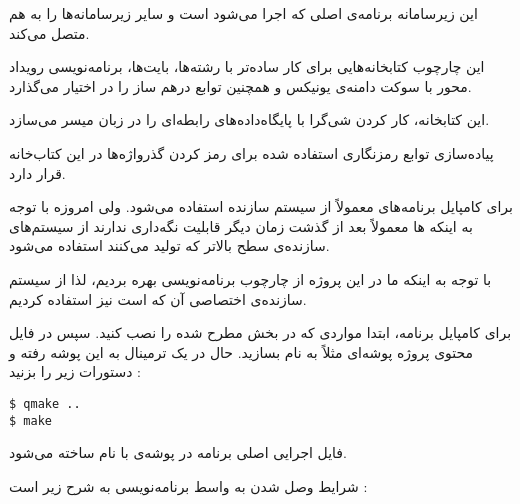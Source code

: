 این زیرسامانه برنامه‌ی اصلی که اجرا می‌شود است و سایر زیر‌سامانه‌ها را به هم متصل می‌کند.




این چارچوب کتابخانه‌هایی برای کار ساده‌تر با رشته‌ها، بایت‌ها، برنامه‌نویسی رویداد محور با سوکت دامنه‌ی یونیکس و همچنین توابع درهم ساز را در اختیار می‌گذارد. 


این کتابخانه، کار کردن شی‌گرا با پایگاه‌داده‌های رابطه‌ای را در زبان  میسر می‌سازد.


پیاده‌سازی توابع رمزنگاری استفاده شده برای رمز کردن گذرواژه‌ها در این کتاب‌خانه قرار دارد.



برای کامپایل برنامه‌های  معمولاً 	از سیستم سازنده  استفاده می‌شود. ولی امروزه با توجه به اینکه ها معمولاً بعد از گذشت زمان دیگر قابلیت نگه‌داری ندارند از سیستم‌های سازنده‌ی سطح بالاتر که  تولید می‌کنند استفاده می‌شود.

با توجه به اینکه ما در این پروژه از چارچوب برنامه‌نویسی  بهره بردیم، لذا از سیستم سازنده‌ی اختصاصی آن که  است نیز استفاده کردیم.

برای کامپایل برنامه، ابتدا مواردی که در بخش  مطرح شده را نصب کنید. سپس در فایل محتوی پروژه پوشه‌ای مثلاً به نام  بسازید. حال در یک ترمینال به این پوشه رفته و دستورات زیر را بزنید :

\lstset{basicstyle=\footnotesize\ttfamily,breaklines=true,language=Bash}
\begin{latin}
\begin{lstlisting}
$ qmake ..
$ make
\end{lstlisting}
\end{latin}

فایل اجرایی اصلی برنامه در پوشه‌ی  با نام  ساخته می‌شود.


شرایط وصل شدن به واسط برنامه‌نویسی به شرح زیر است :

